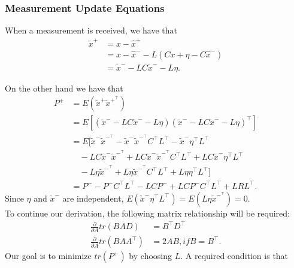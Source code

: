 \subsubsection{Measurement Update Equations}
When a measurement is received, we have that
\begin{align*}
\tilde{x}^+&= x-\hat{x}^+\\
		   &= x-\hat{x}^- -L(Cx+\eta-C\hat{x}^-)\\
		   &= \tilde{x}^- -LC\tilde{x}^- -L\eta.
\end{align*}

On the other hand we have that
\begin{align} \label{eq:P_posteriori}
P^+ &= E(\tilde{x}^+\tilde{x}^{+^\top}) \nonumber\\
	&= E[(\tilde{x}^- -LC\tilde{x}^- -L\eta)(\tilde{x}^- -LC\tilde{x}^- -L\eta)^\top] \nonumber\\
	&= E[\tilde{x}^-\tilde{x}^{-^\top}-\tilde{x}^-\tilde{x}^{-^\top}C^\top L^\top-\tilde{x}^-\eta^\top L^\top \nonumber\\
	& \quad  -LC\tilde{x}^-\tilde{x}^{-^\top}+LC\tilde{x}^-\tilde{x}^{-^\top}C^\top L^\top+LC\tilde{x}^-\eta^\top L^\top \nonumber\\
	& \quad  -L\eta\tilde{x}^{-^\top}+L\eta\tilde{x}^{-^\top}C^\top L^\top+L\eta\eta^\top L^\top] \nonumber\\
	&= P^- -P^-C^\top L^\top-LCP^-+LCP^-C^\top L^\top+LRL^\top.
\end{align}
Since \begin{math} \eta  \end{math} and \begin{math} \tilde{x}^-  \end{math} are independent, \begin{math} E(\tilde{x}^-\eta^\top L^\top)=E(L\eta\tilde{x}^{-^\top})=0  \end{math}. \\
To continue our derivation, the following matrix relationship will be required:
\begin{align*}
\frac{\partial}{\partial A}tr(BAD)&=B^\top D^\top \\
\frac{\partial}{\partial A}tr(BAA^\top)&=2AB, if B = B^\top.
\end{align*}
Our goal is to minimize \begin{math} tr(P^+)  \end{math} by choosing \begin{math} L  \end{math}. A required condition is that
